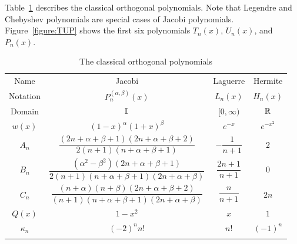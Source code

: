 Table~\ref{table:ClassicalOrthogonalPolynomials} describes the classical orthogonal polynomials. Note that Legendre and Chebyshev polynomials are special cases of Jacobi polynomials. Figure~\ref{figure:TUP} shows the first six polynomials $T_n(x)$, $U_n(x)$, and $P_n(x)$.

\begin{table}[htdp]
\caption{The classical orthogonal polynomials}
\begin{center}
\begin{tabular}{cccc}
\sphline
Name & Jacobi & Laguerre & Hermite\\
\sphline
Notation & $P_n^{(\alpha,\beta)}(x)$ & $L_n(x)$ & $H_n(x)$\\
\sphline
Domain & $\mathbb{I}$ & $[0,\infty)$ & $\mathbb{R}$\\
\sphline
$w(x)$ & $(1-x)^\alpha(1+x)^\beta$ & $e^{-x}$ & $e^{-x^2}$\\
$A_n$ & $\dfrac{(2n+\alpha+\beta+1)(2n+\alpha+\beta+2)}{2(n+1)(n+\alpha+\beta+1)}$ & $-\dfrac{1}{n+1}$ & $2$\\
$B_n$ & $\dfrac{(\alpha^2-\beta^2)(2n+\alpha+\beta+1)}{2(n+1)(n+\alpha+\beta+1)(2n+\alpha+\beta)}$ & $\dfrac{2n+1}{n+1}$ & $0$\\
$C_n$ & $\dfrac{(n+\alpha)(n+\beta)(2n+\alpha+\beta+2)}{(n+1)(n+\alpha+\beta+1)(2n+\alpha+\beta)}$ & $\dfrac{n}{n+1}$ & $2n$\\
$Q(x)$ & $1-x^2$ & $x$ & $1$\\
$\kappa_n$ & $(-2)^nn!$ & $n!$ & $(-1)^n$\\
\sphline
\end{tabular}
\end{center}
\label{table:ClassicalOrthogonalPolynomials}
\end{table}%

